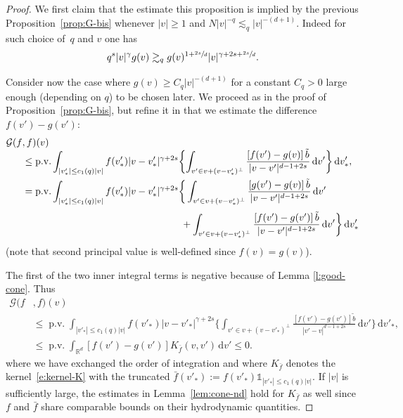 \documentclass[JEP,XML,SOM,Unicode,NoFloatCountersInSection]{cedram}
\theoremstyle{plain}
\theoremstyle{definition}
\numberwithin{equation}{section}
\newcommand{\R}{\mathbb R}
\newcommand{\dd} {\, \mathrm{d}}
\DeclareMathOperator{\PV}{p.v.}
\newcommand{\one}{\mathds{1}}
\let\A N
\begin{document}
\begin{proof}
We first claim that the estimate this proposition is implied by the
previous Proposition~\ref{prop:G-bis} whenever $|v| \ge 1$ and
$\A |v|^{-q} \lesssim_q |v|^{-(d+1)}$. Indeed for such choice of~$q$ and $v$ one has\vspace*{-3pt}
\[
q^s |v|^\gamma g(v) \gtrsim_q g(v)^{1+\sfrac{2s}d}
|v|^{\gamma+2s+\sfrac{2s}d}.
\]

Consider now the case where $g(v) \ge C_q |v|^{-(d+1)}$ for a
constant $C_q>0$ large enough (depending on $q$) to be chosen
later. We proceed as in the proof of Proposition~\ref{prop:G-bis},
but refine it in that we estimate the difference $f(v') - g(v')$:\vspace*{-3pt}
\begin{align*}
\mathcal G(f&,f)(v) \\[-4pt]
&\le \PV \int_{|v'_*| \le c_1(q) |v|} f(v'_*) |v-v'_*|^{\gamma+2s}
\biggl\{ \int_{v' \in v + (v-v'_*)^\bot} \frac{\left[f(v')-g(v)
\right] \tilde b}{|v-v'|^{d-1+2s}} \dd v' \biggr\} \dd
v'_*, \\
&= \PV \int_{|v'_*| \le c_1(q) |v|} f(v'_*) |v-v'_*|^{\gamma+2s} \bigg\{
\int_{v' \in v+ (v-v'_*)^\bot} \frac{\left[g(v')-g(v)\right]
\tilde b}{|v-v'|^{d-1+2s}} \dd v' \\[3pt]
& \hspace*{5.7cm} + \int_{v'
\in v+(v-v'_*)^\bot}
\frac{\left[f(v')-g(v')\right] \tilde b}{|v-v'|^{d-1+2s}} \dd v' \bigg\} \dd v'_*
\end{align*}
(note that second principal value is well-defined since $f(v)=g(v)$).

The first of the two inner integral terms is negative because of Lemma
\ref{l:good-cone}. Thus\vspace*{-3pt}
\begin{align*}
\mathcal G(f&,f)(v) \\[-4pt]
& \leq \PV \int_{|v'_*| \le c_1(q) |v|} f(v'_*) |v-v'_*|^{\gamma+2s}
\bigg\{ \int_{v' \in v+(v-v'_*)^\bot}
\frac{\left[f(v')-g(v')\right]\tilde b}{|v'-v|^{d-1+2s}} \dd
v'\bigg\} \dd v'_*,\\
&\le \PV \int_{\R^d} \left[f(v')-g(v')\right] K_{\bar f}(v,v') \dd
v' \le 0.
\end{align*}
where we have exchanged the order of integration and where
$K_{\bar f}$ denotes the \hbox{kernel}~\eqref{e:kernel-K} with the truncated
$\bar f(v'_*) := f(v'_*) \one_{|v'_*|\le c_1(q) |v|}$. If $|v|$ is
sufficiently large, the estimates in Lemma~\ref{lem:cone-nd} hold for
$K_{\bar f}$ as well since $f$ and $\bar f$ share comparable bounds on
their hydrodynamic quantities.


\end{proof}
\end{document}
